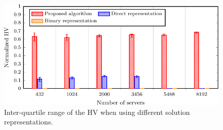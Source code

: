 \begin{figure}[t!]
    \centering
    \includegraphics[width=\linewidth]{graphs/solution_representation/comparison-crop}
    \caption{Inter-quartile range of the HV when using different solution representations.}
    \label{fig:solution_representation_comparison}
\end{figure}
